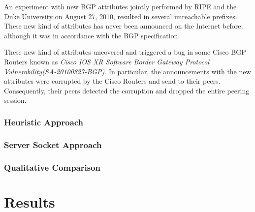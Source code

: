 An experiment with new BGP attributes jointly performed by RIPE and the Duke 
University on August 27, 2010, resulted in several unreachable prefixes. These 
new kind of attributes has never been announced on the Internet before,  
although it was in accordance with the BGP specification\citep{ripe_duke}.

These new kind of attributes uncovered and triggered a bug in some Cisco BGP 
Routers known as \emph{Cisco IOS XR Software Border Gateway Protocol Vulnerability(SA-20100827-BGP)}\citep{cisco_vulnerability}. In particular, the announcements with the new attributes were corrupted 
by the Cisco Routers and send to their peers. Consequently, their peers detected 
the corruption and dropped the entire peering session\citep{ripe_duke}.


\subsubsection{Heuristic Approach}

\subsubsection{Server Socket Approach}

\subsubsection{Qualitative Comparison}


\section{Results}
